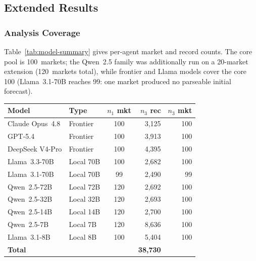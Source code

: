 \subsection{Extended Results}
\label{app:extended-results}

\subsubsection{Analysis Coverage}
Table~\ref{tab:model-summary} gives per-agent market and record counts.  The core pool is
100~markets; the Qwen~2.5 family was additionally run on a 20-market extension
(120~markets total), while frontier and Llama models cover the core 100
(Llama~3.1-70B reaches 99: one market produced no parseable initial forecast).

\begin{center}
\begin{minipage}{\linewidth}
\centering
{}
\label{tab:model-summary}
\small
\begin{tabular}{llcrr}
\toprule
\textbf{Model} & \textbf{Type}
  & \textbf{$n_1$ mkt} & \textbf{$n_3$ rec} & \textbf{$n_3$ mkt} \\
\midrule
Claude Opus~4.8 & Frontier  & 100 & 3{,}125 & 100 \\
GPT-5.4         & Frontier  & 100 & 3{,}913 & 100 \\
DeepSeek V4-Pro & Frontier  & 100 & 4{,}395 & 100 \\
Llama~3.3-70B   & Local 70B & 100 & 2{,}682 & 100 \\
Llama~3.1-70B   & Local 70B &  99 & 2{,}490 &  99 \\
Qwen~2.5-72B    & Local 72B & 120 & 2{,}692 & 100 \\
Qwen~2.5-32B    & Local 32B & 120 & 2{,}693 & 100 \\
Qwen~2.5-14B    & Local 14B & 120 & 2{,}700 & 100 \\
Qwen~2.5-7B     & Local 7B  & 120 & 8{,}636 & 100 \\
Llama~3.1-8B    & Local 8B  & 100 & 5{,}404 & 100 \\
\midrule
\textbf{Total}  &           &     & \textbf{38{,}730} & \\
\bottomrule
\end{tabular}
\end{minipage}
\end{center}

